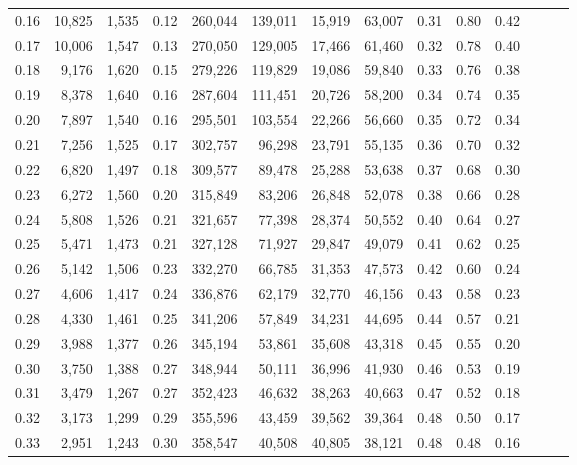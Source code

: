 \begin{tabular}{rrrrrrrrrrrrrr}
0.16 &  10,825 &  1,535 &  0.12 &  260,044 &  139,011 &  15,919 &  63,007 &  0.31 &  0.80 &      0.42 \\
0.17 &  10,006 &  1,547 &  0.13 &  270,050 &  129,005 &  17,466 &  61,460 &  0.32 &  0.78 &      0.40 \\
0.18 &   9,176 &  1,620 &  0.15 &  279,226 &  119,829 &  19,086 &  59,840 &  0.33 &  0.76 &      0.38 \\
0.19 &   8,378 &  1,640 &  0.16 &  287,604 &  111,451 &  20,726 &  58,200 &  0.34 &  0.74 &      0.35 \\
0.20 &   7,897 &  1,540 &  0.16 &  295,501 &  103,554 &  22,266 &  56,660 &  0.35 &  0.72 &      0.34 \\
0.21 &   7,256 &  1,525 &  0.17 &  302,757 &   96,298 &  23,791 &  55,135 &  0.36 &  0.70 &      0.32 \\
0.22 &   6,820 &  1,497 &  0.18 &  309,577 &   89,478 &  25,288 &  53,638 &  0.37 &  0.68 &      0.30 \\
0.23 &   6,272 &  1,560 &  0.20 &  315,849 &   83,206 &  26,848 &  52,078 &  0.38 &  0.66 &      0.28 \\
0.24 &   5,808 &  1,526 &  0.21 &  321,657 &   77,398 &  28,374 &  50,552 &  0.40 &  0.64 &      0.27 \\
0.25 &   5,471 &  1,473 &  0.21 &  327,128 &   71,927 &  29,847 &  49,079 &  0.41 &  0.62 &      0.25 \\
0.26 &   5,142 &  1,506 &  0.23 &  332,270 &   66,785 &  31,353 &  47,573 &  0.42 &  0.60 &      0.24 \\
0.27 &   4,606 &  1,417 &  0.24 &  336,876 &   62,179 &  32,770 &  46,156 &  0.43 &  0.58 &      0.23 \\
0.28 &   4,330 &  1,461 &  0.25 &  341,206 &   57,849 &  34,231 &  44,695 &  0.44 &  0.57 &      0.21 \\
0.29 &   3,988 &  1,377 &  0.26 &  345,194 &   53,861 &  35,608 &  43,318 &  0.45 &  0.55 &      0.20 \\
0.30 &   3,750 &  1,388 &  0.27 &  348,944 &   50,111 &  36,996 &  41,930 &  0.46 &  0.53 &      0.19 \\
0.31 &   3,479 &  1,267 &  0.27 &  352,423 &   46,632 &  38,263 &  40,663 &  0.47 &  0.52 &      0.18 \\
0.32 &   3,173 &  1,299 &  0.29 &  355,596 &   43,459 &  39,562 &  39,364 &  0.48 &  0.50 &      0.17 \\
0.33 &   2,951 &  1,243 &  0.30 &  358,547 &   40,508 &  40,805 &  38,121 &  0.48 &  0.48 &      0.16 \\

\end{tabular}
